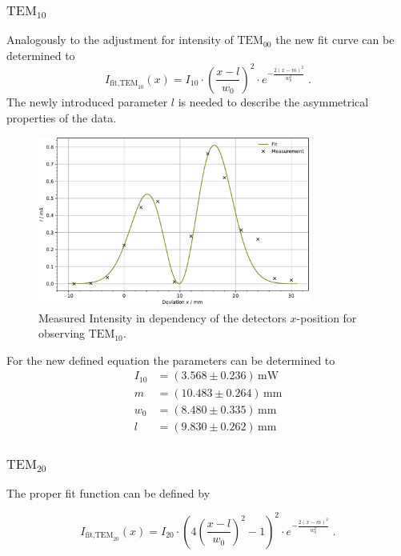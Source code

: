 \subsubsection{$\text{TEM}_{10}$}

Analogously to the adjustment for intensity of $\text{TEM}_{00}$ the new fit curve can be determined to 
\begin{equation*}
    I_{\text{fit,TEM}_{10}}(x) = I_{10} \cdot \left( \frac{x - l}{w_0} \right)^2 \cdot e^{-\frac{2(x - m)^2}{w_0^2}}\; .
\end{equation*}
The newly introduced parameter $l$ is needed to describe the asymmetrical properties of the data.
\begin{figure}
	\centering
	\includegraphics[width=0.8\textwidth]{content/plots/TEM01.pdf}
	\caption{Measured Intensity in dependency of the detectors $x$-position for observing $\text{TEM}_{10}$.}
	\label{fig:TEM01}
\end{figure}
For the new defined equation the parameters can be determined to 
\begin{align*}
I_{10} &= \left( 3.568 \pm 0.236 \right) \, \text{mW} \\
m &= \left( 10.483 \pm 0.264 \right) \, \text{mm} \\
w_0 &= \left( 8.480 \pm 0.335 \right) \, \text{mm} \\
l &= \left( 9.830 \pm 0.262 \right) \, \text{mm}
\end{align*}

\subsubsection{$\text{TEM}_{20}$}
The proper fit function can be defined by 

\begin{equation*}
    I_{\text{fit,TEM}_{20}}(x)  = I_{20} \cdot \left( 4 \left( \frac{x - l}{w_0} \right)^2 - 1 \right)^2 \cdot e^{-\frac{2(x - m)^2}{w_0^2}}\; .
\end{equation*}

